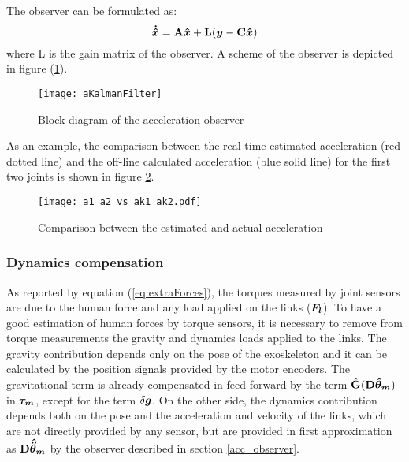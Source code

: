 The observer can be formulated as:
%
\begin{equation}
{ \boldsymbol {\dot{\hat{x}}}}=\mathbf{A}{ \boldsymbol {\hat{x}}}+\mathbf{L}({ \boldsymbol {y}}-\mathbf{C}{ \boldsymbol {\hat{x}}})
\end{equation}
%
where L is the gain matrix of the observer. A scheme of the observer is depicted in figure (\ref{fig:block_acc_observer}). 
%
\begin{figure}[htb]
	\centering
	\texttt{[image: aKalmanFilter]}
	\caption{Block diagram of the acceleration observer}
	\label{fig:block_acc_observer}
\end{figure}

As an example, the comparison between the real-time estimated acceleration (red dotted line) and the off-line calculated acceleration (blue solid line) for the first two joints is shown in figure \ref{fig:acceleration_validation}.
%
\begin{figure}[htb]
	\centering
	\texttt{[image: a1\_a2\_vs\_ak1\_ak2.pdf]}
	\caption{Comparison between the estimated and actual acceleration}
	\label{fig:acceleration_validation}
\end{figure}


\subsubsection{Dynamics compensation} \label{Dynamics compensation}

As reported by equation (\ref{eq:extraForces}), the torques measured by joint sensors are due to the human force and any load applied on the links (${ \boldsymbol {F_l}}$). To have a good estimation of human forces by torque sensors, it is necessary to remove from torque measurements the gravity and dynamics loads applied to the links. The gravity contribution  depends only on the pose of the exoskeleton and it can be calculated by the position signals provided by the motor encoders. The gravitational term is already compensated in feed-forward by the term $\hat{\mathbf{G}}(\mathbf{D}{ \boldsymbol {\hat{\theta}_m}})$ in ${ \boldsymbol {\tau_{m}}}$,
except for the term $\delta { \boldsymbol {g}}$.
On the other side, the dynamics contribution depends both on the pose and the acceleration and velocity of the links, which are not directly provided by any sensor, but are provided in first approximation as $\mathbf{D} { \boldsymbol {\hat{\ddot{\theta}}_m}}$  by the observer described in section \ref{acc_observer}.

